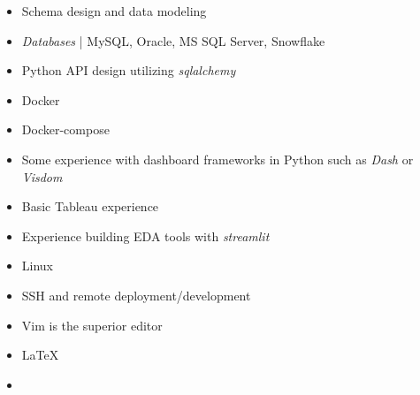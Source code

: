 \begin{itemize}
\item Schema design and data modeling
\item \textit{Databases} | MySQL, Oracle, MS SQL Server, Snowflake
\item Python API design utilizing \textit{sqlalchemy}

\end{itemize}


\begin{itemize}
\item Docker
\item Docker-compose

\end{itemize}

\begin{itemize}
\item Some experience with dashboard frameworks in Python such as \textit{Dash} or \textit{Visdom}
\item Basic Tableau experience
\item Experience building EDA tools with \textit{streamlit}

\end{itemize}

\begin{itemize}
\item Linux {\faLinux}
\item SSH and remote deployment/development
\item Vim is the superior editor
\item \LaTeX
\item  {\faGit}
\end{itemize}
